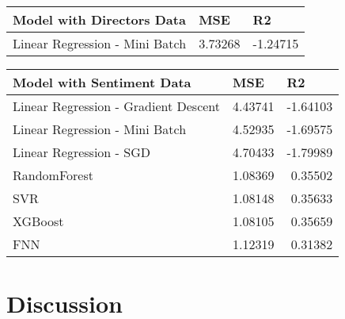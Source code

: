 \documentclass[11pt,letterpaper,oneside,titlepage]{article}
\begin{document}
\begin{center}
\begin{tabular}{|l|l|l|}
\hline
\textbf{Model with Directors Data} & \textbf{MSE}                 & \textbf{R2}                   \\ \hline
Linear Regression - Mini Batch     & \multicolumn{1}{r|}{3.73268} & \multicolumn{1}{r|}{-1.24715} \\ \hline
\end{tabular}
    \captionsetup{justification=centering}
    \label{directors}
\end{center} \label{baseline}
\FloatBarrier

\begin{center}
\begin{tabular}{|l|r|r|}
\hline
\textbf{Model with Sentiment Data}                                     & \multicolumn{1}{l|}{\textbf{MSE}} & \multicolumn{1}{l|}{\textbf{R2}} \\ \hline
Linear Regression - Gradient Descent           & 4.43741                  & -1.64103                \\ \hline
Linear Regression - Mini Batch                 & 4.52935                  & -1.69575                \\ \hline
Linear Regression - SGD & 4.70433                  & -1.79989                \\ \hline
RandomForest                              & 1.08369                  & 0.35502                 \\ \hline
SVR                                       & 1.08148                  & 0.35633                 \\ \hline
XGBoost                                   & 1.08105                  & 0.35659                 \\ \hline
FNN                                       & 1.12319                  & 0.31382                 \\ \hline
\end{tabular}
    \captionsetup{justification=centering}
    \label{sentiment}
\end{center} \label{baseline}
\FloatBarrier

\section{Discussion}

\end{document}
